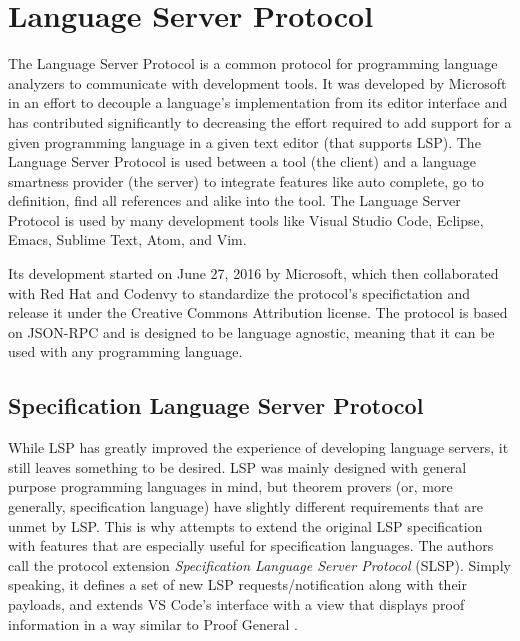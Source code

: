 \section{Language Server Protocol}

The Language Server Protocol is a common protocol for programming language analyzers to communicate with development tools. It was developed by Microsoft in an effort to decouple a language's implementation from its editor interface \cite{Buender2019} and has contributed significantly to decreasing the effort required to add support for a given programming language in a given text editor (that supports LSP). The Language Server Protocol is used between a tool (the client) and a language smartness provider (the server) to integrate features like auto complete, go to definition, find all references and alike into the tool. The Language Server Protocol is used by many development tools like Visual Studio Code, Eclipse, Emacs, Sublime Text, Atom, and Vim.

Its development started on June 27, 2016 by Microsoft, which then collaborated with Red Hat and Codenvy to standardize the protocol's specifictation and release it under the Creative Commons Attribution license.
The protocol is based on JSON-RPC and is designed to be language agnostic, meaning that it can be used with any programming language.


\subsection{Specification Language Server Protocol}

While LSP has greatly improved the experience of developing language servers,
it still leaves something to be desired.
LSP was mainly designed with general purpose programming languages in mind,
but theorem provers (or, more generally, specification language) have slightly
different requirements that are unmet by LSP.
This is why \cite{JonasKjaerRask2021} attempts to extend the original LSP
specification with features that are especially useful for specification languages.
The authors call the protocol extension \textit{Specification Language Server Protocol} (SLSP).
Simply speaking, it defines a set of new LSP requests/notification along with
their payloads, and extends VS Code's interface with a view that displays proof
information in a way similar to Proof General \cite{Aspinall2000}.


